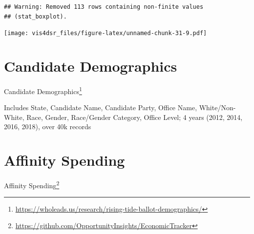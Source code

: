 \documentclass[
]{krantz}
\renewcommand{\href}[2]{#2\footnote{\url{#1}}}
\begin{document}
\begin{verbatim}
## Warning: Removed 113 rows containing non-finite values
## (stat_boxplot).
\end{verbatim}

\texttt{[image: vis4dsr\_files/figure-latex/unnamed-chunk-31-9.pdf]}

\hypertarget{candidate-demographics}{%
\section*{Candidate Demographics}\label{candidate-demographics}}


\href{https://wholeads.us/research/rising-tide-ballot-demographics/}{Candidate Demographics}

Includes State, Candidate Name, Candidate Party, Office Name, White/Non-White, Race, Gender, Race/Gender Category, Office Level; 4 years (2012, 2014, 2016, 2018), over 40k records

\hypertarget{affinity-spending}{%
\section*{Affinity Spending}\label{affinity-spending}}


\href{https://github.com/OpportunityInsights/EconomicTracker}{Affinity Spending}

  

\backmatter
\printindex
\end{document}
